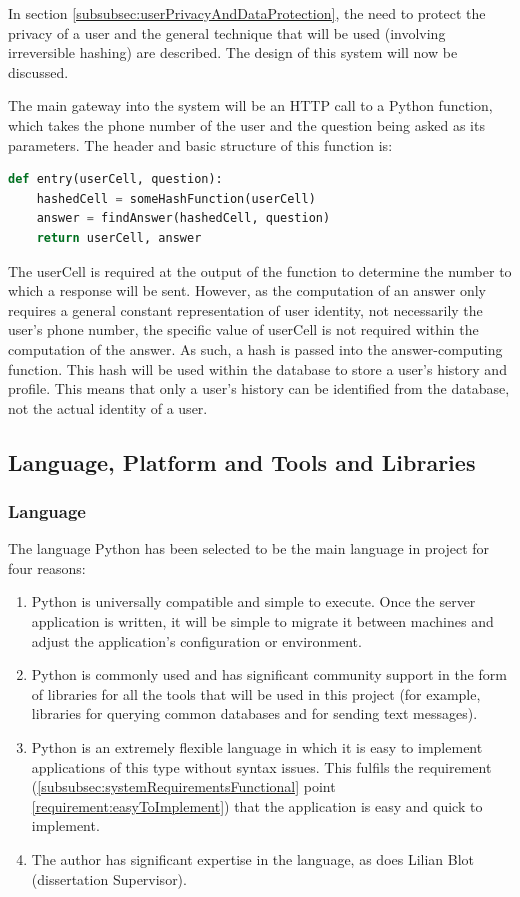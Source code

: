 \documentclass{article}
\begin{document}
In section \ref{subsubsec:userPrivacyAndDataProtection}, the need to protect the privacy of a user and the general technique that will be used (involving irreversible hashing) are described.  The design of this system will now be discussed.

The main gateway into the system will be an HTTP call to a Python function, which takes the phone number of the user and the question being asked as its parameters.  The header and basic structure of this function is:

\begin{lstlisting}[language=Python]
def entry(userCell, question):
    hashedCell = someHashFunction(userCell)
    answer = findAnswer(hashedCell, question)
    return userCell, answer
\end{lstlisting}

The userCell is required at the output of the function to determine the number to which a response will be sent.  However, as the computation of an answer only requires a general constant representation of user identity, not necessarily the user's phone number, the specific value of userCell is not required within the computation of the answer.  As such, a hash is passed into the answer-computing function.  This hash will be used within the database to store a user's history and profile.  This means that only a user's history can be identified from the database, not the actual identity of a user.

\subsection{Language, Platform and Tools and Libraries}
\subsubsection{Language}
The language Python has been selected to be the main language in project for four reasons:
\begin{enumerate}
  \item Python is universally compatible and simple to execute.  Once the server application is written, it will be simple to migrate it between machines and adjust the application's configuration or environment.
  \item Python is commonly used and has significant community support in the form of libraries for all the tools that will be used in this project (for example, libraries for querying common databases and for sending text messages).
  \item Python is an extremely flexible language in which it is easy to implement applications of this type without syntax issues.  This fulfils the requirement (\ref{subsubsec:systemRequirementsFunctional} point \ref{requirement:easyToImplement}) that the application is easy and quick to implement.
  \item The author has significant expertise in the language, as does Lilian Blot (dissertation Supervisor).
\end{enumerate}
\end{document}
